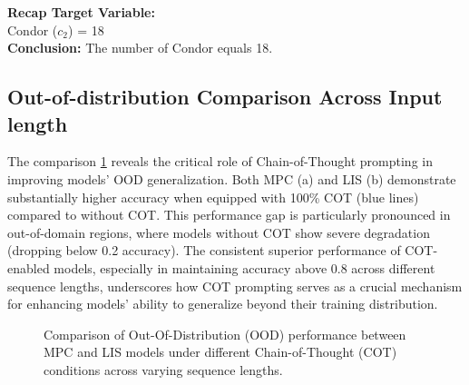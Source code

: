 \textbf{Recap Target Variable:} \\
Condor (\( c_2 \)) = 18 \\

\textbf{Conclusion:} The number of Condor equals 18.

\subsection{Out-of-distribution Comparison Across Input length}
The comparison \ref{fig:ood_detail} reveals the critical role of Chain-of-Thought prompting in improving models' OOD generalization. Both MPC (a) and LIS (b) demonstrate substantially higher accuracy when equipped with 100\% COT (blue lines) compared to without COT. This performance gap is particularly pronounced in out-of-domain regions, where models without COT show severe degradation (dropping below 0.2 accuracy). The consistent superior performance of COT-enabled models, especially in maintaining accuracy above 0.8 across different sequence lengths, underscores how COT prompting serves as a crucial mechanism for enhancing models' ability to generalize beyond their training distribution.
\begin{figure}[]
\centering
{}\hfill
{}
\caption{Comparison of Out-Of-Distribution (OOD) performance between MPC and LIS models under different Chain-of-Thought (COT) conditions across varying sequence lengths.}
\label{fig:ood_detail}
\end{figure}